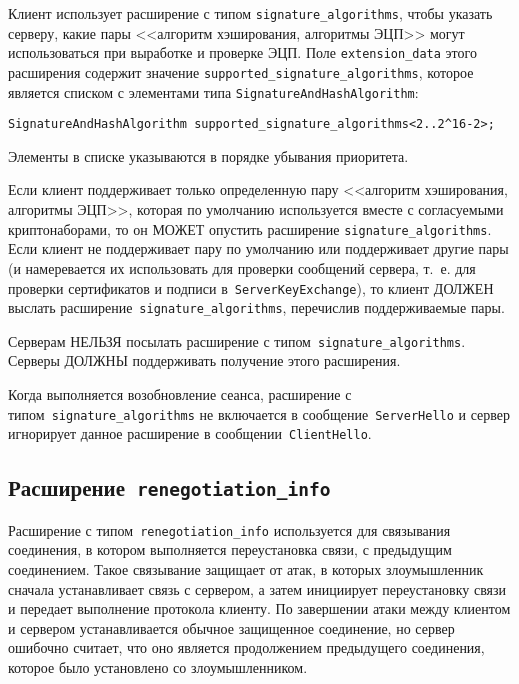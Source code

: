 Клиент использует расширение с типом \lstinline{signature_algorithms},
чтобы указать серверу, какие пары <<алгоритм хэширования, алгоритмы ЭЦП>>
могут использоваться при выработке и проверке ЭЦП. Поле
\lstinline{extension_data} этого расширения содержит значение
\lstinline{supported_signature_algorithms}, которое является списком с
элементами типа \lstinline{SignatureAndHashAlgorithm}:
\begin{lstlisting}
SignatureAndHashAlgorithm supported_signature_algorithms<2..2^16-2>;
\end{lstlisting}

Элементы в списке указываются в порядке убывания приоритета.
 
Если клиент поддерживает только определенную пару <<алгоритм хэширования, 
алгоритмы ЭЦП>>, которая по умолчанию используется вместе с согласуемыми 
криптонаборами, то он МОЖЕТ опустить расширение \lstinline{signature_algorithms}. 
Если клиент не поддерживает пару по умолчанию или поддерживает другие пары 
(и намеревается их использовать для проверки сообщений сервера, т.~е. для 
проверки сертификатов и подписи в~\lstinline{ServerKeyExchange}), 
то клиент ДОЛЖЕН выслать расширение~\lstinline{signature_algorithms}, 
перечислив поддерживаемые пары.  

Серверам НЕЛЬЗЯ посылать расширение с типом~\lstinline{signature_algorithms}. 
Серверы ДОЛЖНЫ поддерживать получение этого расширения. 

Когда выполняется возобновление сеанса, расширение с 
типом~\lstinline{signature_algorithms} не включается в 
сообщение~\lstinline{ServerHello} и сервер игнорирует данное расширение в 
сообщении~\lstinline{ClientHello}.   

\subsection{Расширение~\lstinline{renegotiation_info}}\label{HANDSHAKE.7.2}

Расширение с типом~\lstinline{renegotiation_info} используется для связывания 
соединения, в котором выполняется переустановка связи, с предыдущим 
соединением. Такое связывание защищает от атак, в которых злоумышленник 
сначала устанавливает связь с сервером, а затем инициирует переустановку 
связи и передает выполнение протокола клиенту. По завершении атаки между 
клиентом и сервером устанавливается обычное защищенное соединение, но 
сервер ошибочно считает, что оно является продолжением предыдущего 
соединения, которое было установлено со злоумышленником. 

